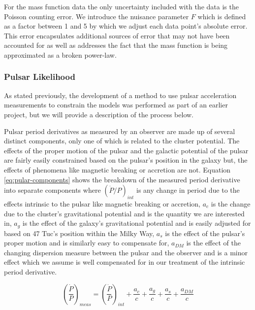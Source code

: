 For the mass function data the only uncertainty included with the data is the Poisson counting
error. We introduce the nuisance parameter $F$ which is defined as a factor between 1 and 5 by which
we adjust each data point's absolute error. This error encapsulates additional sources of error that
may not have been accounted for as well as addresses the fact that the mass function is being
approximated as a broken power-law.


\subsubsection{Pulsar Likelihood}

As stated previously, the development of a method to use pulsar acceleration measurements to
constrain the models was performed as part of an earlier project, but we will provide a description
of the process below.




Pulsar period derivatives as measured by an observer are made up of several distinct components,
only one of which is related to the cluster potential. The effects of the proper motion of the
pulsar and the galactic potential of the pulsar are fairly easily constrained based on the pulsar's
position in the galaxy but, the effects of phenomena like magnetic breaking or accretion are not.
Equation \ref{eq:pular-components} shows the breakdown of the measured period derivative into
separate components where $(\dot{P}/P)_{int}$ is any change in period due to the effects intrinsic
to the pulsar like magnetic breaking or accretion, $a_c$ is the change due to the cluster's
gravitational potential and is the quantity we are interested in, $a_g$ is the effect of the
galaxy's gravitational potential and is easily adjusted for based on 47 Tuc's position within the
Milky Way, $a_s$ is the effect of the pulsar's proper motion and is similarly easy to compensate
for, $a_{DM}$ is the effect of the changing dispersion measure between the pulsar and the observer
and is a minor effect which we assume is well compensated for in our treatment of the intrinsic
period derivative.

\begin{equation}
    \left(\frac{\dot{P}}{P}\right)_{meas} = \left(\frac{\dot{P}}{P}\right)_{int} + \frac{a_c}{c} +
    \frac{a_g}{c} + \frac{a_s}{c} + \frac{a_{DM}}{c}
    \label{eq:pular-components}
\end{equation}



